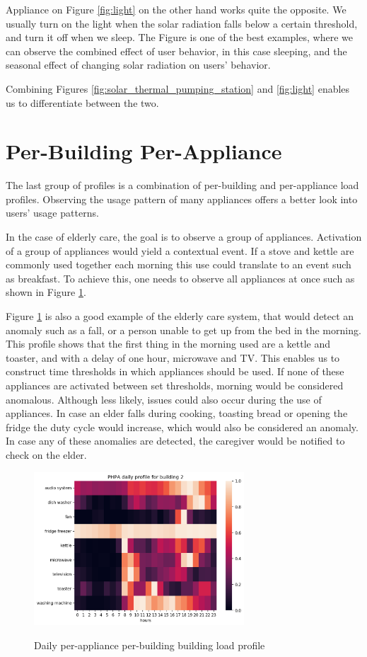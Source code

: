 Appliance on Figure \ref{fig:light} on the other hand works quite the opposite.
We usually turn on the light when the solar radiation falls below a certain threshold, and turn it off when we sleep.
The Figure is one of the best examples, where we can observe the combined effect of user behavior, in this case sleeping, and the seasonal effect of changing solar radiation on users' behavior. 

Combining Figures \ref{fig:solar_thermal_pumping_station} and \ref{fig:light} enables us to differentiate between the two. 

\section{Per-Building Per-Appliance}

The last group of profiles is a combination of per-building and per-appliance load profiles.
Observing the usage pattern of many appliances offers a better look into users' usage patterns.

In the case of elderly care, the goal is to observe a group of appliances.
Activation of a group of appliances would yield a contextual event.
If a stove and kettle are commonly used together each morning this use could translate to an event such as breakfast. 
To achieve this, one needs to observe all appliances at once such as shown in Figure \ref{fig:PHPA}.

Figure \ref{fig:PHPA} is also a good example of the elderly care system, that would detect an anomaly such as a fall, or a person unable to get up from the bed in the morning.
This profile shows that the first thing in the morning used are a kettle and toaster, and with a delay of one hour, microwave and TV. 
This enables us to construct time thresholds in which appliances should be used.
If none of these appliances are activated between set thresholds, morning would be considered anomalous.
Although less likely, issues could also occur during the use of appliances. 
In case an elder falls during cooking, toasting bread or opening the fridge the duty cycle would increase, which would also be considered an anomaly.
In case any of these anomalies are detected, the caregiver would be notified to check on the elder. 

\begin{figure}[H]
	\centering
	\caption{Daily per-appliance per-building building load profile}
	\includegraphics[width=0.7\textwidth]{../Figures/LPS/PHPA.png}
	\label{fig:PHPA}
\end{figure}


